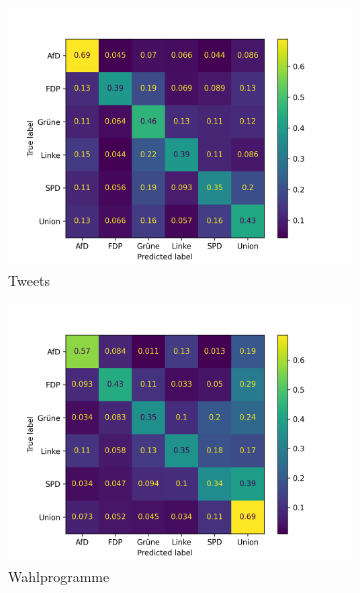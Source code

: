 \begin{figure}[H]
  \centering
  \begin{subfigure}{0.49\textwidth}
    \includegraphics[width=\textwidth]{data/images/modeling/cnn/under/tweets_confusion_matrix.png}
    \caption{Tweets}
    \label{sfig:confusionMatrixCnnTweets}
  \end{subfigure}
  \hfill
  \begin{subfigure}{0.49\textwidth}
    \includegraphics[width=\textwidth]{data/images/modeling/cnn/under/party_programs_confusion_matrix.png}
    \caption{Wahlprogramme}
    \label{sfig:confusionMatrixCnnManifest}
  \end{subfigure}
  \hfill
  \begin{subfigure}{0.49\textwidth}

\end{subfigure}
\end{figure}
